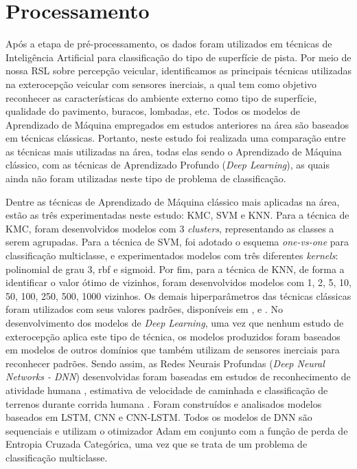 \section{Processamento}

Após a etapa de pré-processamento, os dados foram utilizados em técnicas de Inteligência Artificial para classificação do tipo de superfície de pista. Por meio de nossa RSL sobre percepção veicular, identificamos as principais técnicas utilizadas na exterocepção veicular com sensores inerciais, a qual tem como objetivo reconhecer as características do ambiente externo como tipo de superfície, qualidade do pavimento, buracos, lombadas, etc. Todos os modelos de Aprendizado de Máquina empregados em estudos anteriores na área são baseados em técnicas clássicas. Portanto, neste estudo foi realizada uma comparação entre as técnicas mais utilizadas na área, todas elas sendo o Aprendizado de Máquina clássico, com as técnicas de Aprendizado Profundo (\textit{Deep Learning}), as quais ainda não foram utilizadas neste tipo de problema de classificação.

Dentre as técnicas de Aprendizado de Máquina clássico mais aplicadas na área, estão as três experimentadas neste estudo: KMC, SVM e KNN. Para a técnica de KMC, foram desenvolvidos modelos com 3 \textit{clusters}, representando as classes a serem agrupadas. Para a técnica de SVM, foi adotado o esquema \textit{one-vs-one} para classificação multiclasse, e experimentados modelos com três diferentes \textit{kernels}: polinomial de grau 3, rbf e sigmoid. Por fim, para a técnica de KNN, de forma a identificar o valor ótimo de vizinhos, foram desenvolvidos modelos com 1, 2, 5, 10, 50, 100, 250, 500, 1000 vizinhos. Os demais hiperparâmetros das técnicas clássicas foram utilizados com seus valores padrões, disponíveis em ,  e . No desenvolvimento dos modelos de \textit{Deep Learning}, uma vez que nenhum estudo de exterocepção aplica este tipo de técnica, os modelos produzidos foram baseados em modelos de outros domínios que também utilizam de sensores inerciais para reconhecer padrões. Sendo assim, as Redes Neurais Profundas (\textit{Deep Neural Networks - DNN}) desenvolvidas foram baseadas em estudos de reconhecimento de atividade humana \cite{Deep2019,Alemayoh2019,Chen2015,Yang2018,Zebin2018,Zebin2019,Wang2019,Ahmad2019}, estimativa de velocidade de caminhada \cite{Shrestha2018} e classificação de terrenos durante corrida humana \cite{Dixon2019}. Foram construídos e analisados modelos baseados em LSTM, CNN e CNN-LSTM. Todos os modelos de DNN são sequenciais e utilizam o otimizador Adam em conjunto com a função de perda de Entropia Cruzada Categórica, uma vez que se trata de um problema de classificação multiclasse.


